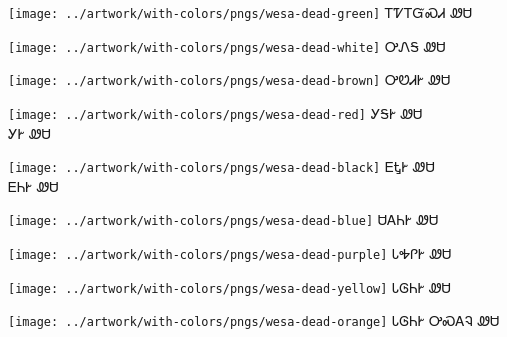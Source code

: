 \documentclass[avery5371]{flashcards}%
\begin{document}
\begin{flashcard}{
\texttt{[image: ../artwork/with-colors/pngs/wesa-dead-green]}
}\Huge ᎢᏤᎢᏳᏍᏗ ᏪᏌ
\end{flashcard}

\begin{flashcard}{
\texttt{[image: ../artwork/with-colors/pngs/wesa-dead-white]}
}\Huge ᎤᏁᎦ ᏪᏌ
\end{flashcard}

\begin{flashcard}{
\texttt{[image: ../artwork/with-colors/pngs/wesa-dead-brown]}
}\Huge ᎤᏬᏗᎨ ᏪᏌ
\end{flashcard}

\begin{flashcard}{
\texttt{[image: ../artwork/with-colors/pngs/wesa-dead-red]}
}\Huge ᎩᎦᎨ ᏪᏌ\\ᎩᎨ ᏪᏌ
\end{flashcard}

\begin{flashcard}{
\texttt{[image: ../artwork/with-colors/pngs/wesa-dead-black]}
}\Huge ᎬᎿᎨ ᏪᏌ\\ᎬᏂᎨ ᏪᏌ
\end{flashcard}

\begin{flashcard}{
\texttt{[image: ../artwork/with-colors/pngs/wesa-dead-blue]}
}\Huge ᏌᎪᏂᎨ ᏪᏌ
\end{flashcard}

\begin{flashcard}{
\texttt{[image: ../artwork/with-colors/pngs/wesa-dead-purple]}
}\Huge ᏓᎭᎵᎨ ᏪᏌ
\end{flashcard}

\begin{flashcard}{
\texttt{[image: ../artwork/with-colors/pngs/wesa-dead-yellow]}
}\Huge ᏓᎶᏂᎨ ᏪᏌ
\end{flashcard}

\begin{flashcard}{
\texttt{[image: ../artwork/with-colors/pngs/wesa-dead-orange]}
}\Huge ᏓᎶᏂᎨ ᎤᏍᎪᎸ ᏪᏌ
\end{flashcard}
\end{document}
